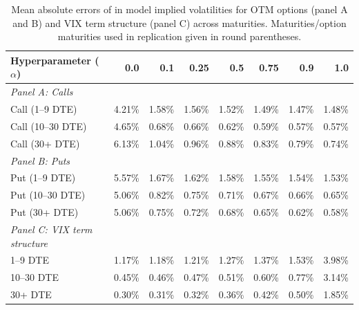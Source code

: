 \documentclass[12pt]{article}
\begin{document}
\begin{table}[!t]
\begin{tabular}{lrrrrrrr}
\toprule
Hyperparameter ($\alpha$) & 0.0 & 0.1 & 0.25 & 0.5 & 0.75 & 0.9 & 1.0 \\
\midrule
\textit{Panel A: Calls} &  &  &  &  &  &  &  \\
Call (1--9 DTE) & 4.21\% & 1.58\% & 1.56\% & 1.52\% & 1.49\% & 1.47\% & 1.48\% \\
Call (10--30 DTE) & 4.65\% & 0.68\% & 0.66\% & 0.62\% & 0.59\% & 0.57\% & 0.57\% \\
Call (30+ DTE) & 6.13\% & 1.04\% & 0.96\% & 0.88\% & 0.83\% & 0.79\% & 0.74\% \\
\midrule
\textit{Panel B: Puts} &  &  &  &  &  &  &  \\
Put (1--9 DTE) & 5.57\% & 1.67\% & 1.62\% & 1.58\% & 1.55\% & 1.54\% & 1.53\% \\
Put (10--30 DTE) & 5.06\% & 0.82\% & 0.75\% & 0.71\% & 0.67\% & 0.66\% & 0.65\% \\
Put (30+ DTE) & 5.06\% & 0.75\% & 0.72\% & 0.68\% & 0.65\% & 0.62\% & 0.58\% \\
\midrule 
\textit{Panel C: VIX term structure} &  &  &  &  &  &  &  \\
1--9 DTE & 1.17\% & 1.18\% & 1.21\% & 1.27\% & 1.37\% & 1.53\% & 3.98\% \\
10--30 DTE & 0.45\% & 0.46\% & 0.47\% & 0.51\% & 0.60\% & 0.77\% & 3.14\% \\
30+ DTE & 0.30\% & 0.31\% & 0.32\% & 0.36\% & 0.42\% & 0.50\% & 1.85\% \\
\bottomrule
\end{tabular}
\caption{Mean absolute errors of in model implied volatilities for OTM options (panel A and B) and VIX term structure (panel C) across maturities. Maturities/option maturities used in replication given in round parentheses. }
\label{tab:mae_iv}
\end{table}
\end{document}
